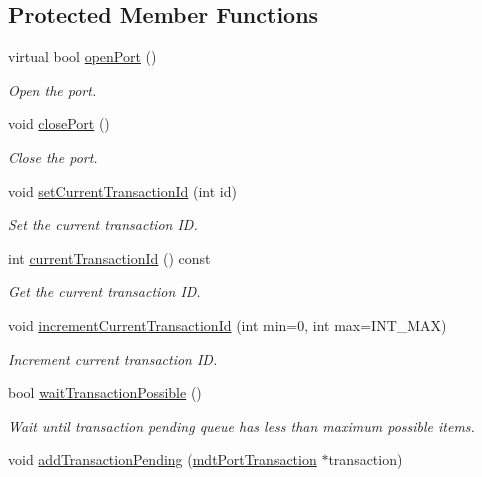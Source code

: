 \subsection*{Protected Member Functions}
\begin{DoxyCompactItemize}
\item 
virtual bool \hyperlink{classmdt_port_manager_aab594613e8985590c835194efbc27b5e}{open\-Port} ()
\begin{DoxyCompactList}\small\item\em Open the port. \end{DoxyCompactList}\item 
void \hyperlink{classmdt_port_manager_ace8065f1f5083041ee7f65c2892bc77d}{close\-Port} ()
\begin{DoxyCompactList}\small\item\em Close the port. \end{DoxyCompactList}\item 
void \hyperlink{classmdt_port_manager_a3f1d25b2441c467c0de9908c73422a93}{set\-Current\-Transaction\-Id} (int id)
\begin{DoxyCompactList}\small\item\em Set the current transaction I\-D. \end{DoxyCompactList}\item 
int \hyperlink{classmdt_port_manager_a19abf29c8948cde0337d67c9722c25aa}{current\-Transaction\-Id} () const 
\begin{DoxyCompactList}\small\item\em Get the current transaction I\-D. \end{DoxyCompactList}\item 
void \hyperlink{classmdt_port_manager_a4d009936a0a5130f3bfecb69fee4ce42}{increment\-Current\-Transaction\-Id} (int min=0, int max=I\-N\-T\-\_\-\-M\-A\-X)
\begin{DoxyCompactList}\small\item\em Increment current transaction I\-D. \end{DoxyCompactList}\item 
bool \hyperlink{classmdt_port_manager_ac04a12f8aa20ba04695083afce45a6cc}{wait\-Transaction\-Possible} ()
\begin{DoxyCompactList}\small\item\em Wait until transaction pending queue has less than maximum possible items. \end{DoxyCompactList}\item 
void \hyperlink{classmdt_port_manager_ac58ed84e0e9230d1931557bc4bbe8a50}{add\-Transaction\-Pending} (\hyperlink{classmdt_port_transaction}{mdt\-Port\-Transaction} $\ast$transaction)

\end{DoxyCompactItemize}
